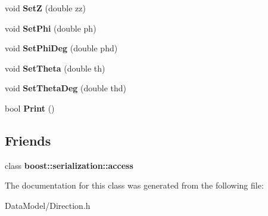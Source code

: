 \begin{DoxyCompactItemize}
\item 
\hypertarget{classDirection_af79a87b020ea1122d7754f8c382e5973}{
void {\bfseries SetZ} (double zz)}
\label{classDirection_af79a87b020ea1122d7754f8c382e5973}

\item 
\hypertarget{classDirection_acb7c66942c436968aa207945362afdc0}{
void {\bfseries SetPhi} (double ph)}
\label{classDirection_acb7c66942c436968aa207945362afdc0}

\item 
\hypertarget{classDirection_a1d14bbfe02ca398b2cd6ae175cd05a8a}{
void {\bfseries SetPhiDeg} (double phd)}
\label{classDirection_a1d14bbfe02ca398b2cd6ae175cd05a8a}

\item 
\hypertarget{classDirection_ac14dae5fc8c04039b68f5c4afa1444de}{
void {\bfseries SetTheta} (double th)}
\label{classDirection_ac14dae5fc8c04039b68f5c4afa1444de}

\item 
\hypertarget{classDirection_aed59dbad937a7d05bd7bb90344869e32}{
void {\bfseries SetThetaDeg} (double thd)}
\label{classDirection_aed59dbad937a7d05bd7bb90344869e32}

\item 
\hypertarget{classDirection_aa0dc919856fbf935470d8e34d042bc9a}{
bool {\bfseries Print} ()}
\label{classDirection_aa0dc919856fbf935470d8e34d042bc9a}

\end{DoxyCompactItemize}
\subsection*{Friends}
\begin{DoxyCompactItemize}
\item 
\hypertarget{classDirection_ac98d07dd8f7b70e16ccb9a01abf56b9c}{
class {\bfseries boost::serialization::access}}
\label{classDirection_ac98d07dd8f7b70e16ccb9a01abf56b9c}

\end{DoxyCompactItemize}


The documentation for this class was generated from the following file:\begin{DoxyCompactItemize}
\item 
DataModel/Direction.h\end{DoxyCompactItemize}
